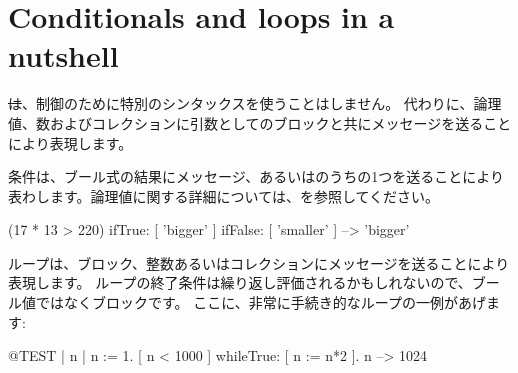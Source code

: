 \documentclass[a4paper,10pt,twoside]{book}
\begin{document}





\section{Conditionals and loops in a nutshell}

\st は、制御のために特別のシンタックスを使うことはしません。
代わりに、論理値、数およびコレクションに引数としてのブロックと共にメッセージを送ることにより表現します。

条件は、ブール式の結果にメッセージ、あるいはのうちの1つを送ることにより表わします。論理値に関する詳細については、を参照してください。

\begin{code}{}
(17 * 13 > 220)
   ifTrue: [ 'bigger' ]
   ifFalse: [ 'smaller' ] --> 'bigger'
\end{code}

ループは、ブロック、整数あるいはコレクションにメッセージを送ることにより表現します。
ループの終了条件は繰り返し評価されるかもしれないので、ブール値ではなくブロックです。
ここに、非常に手続き的なループの一例があげます:

\begin{code}{@TEST | n |}
n := 1.
[ n < 1000 ] whileTrue: [ n := n*2 ].
n --> 1024
\end{code}
\end{document}
